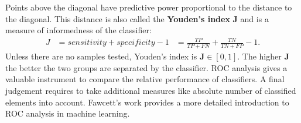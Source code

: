 Points above the diagonal have predictive power proportional to the distance to the diagonal.
This distance is also called the \textbf{Youden's index} $\mathbf{J}$\cite{youden_cancer1950} and is a measure of informedness of the classifier:
\begin{equation}
\begin{aligned}
    J &= sensitivity + specificity - 1
      &= \frac{TP}{TP + FN} + \frac{TN}{TN + FP} - 1\text{.}
\end{aligned}
\label{eq:youden}
\end{equation}
Unless there are no samples tested, Youden's index is $\mathbf{J} \in [0, 1]$.
The higher $\mathbf{J}$ the better the two groups are separated by the classifier.
\acrshort{ROC} analysis gives a valuable instrument to compare the relative performance of classifiers.
A final judgement requires to take additional measures like absolute number of classified elements into account.
Fawcett's\cite{fawcett_2006} work provides a more detailed introduction to \acrshort{ROC} analysis in machine learning.
